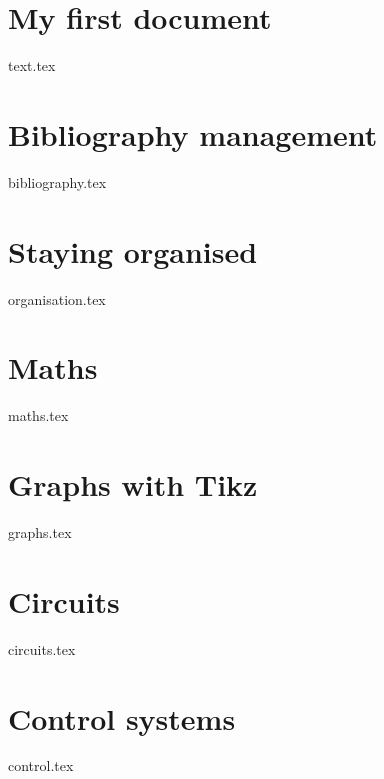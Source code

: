 \section{My first document}
    {text.tex}
\section{Bibliography management}
    {bibliography.tex}
\section{Staying organised}
    {organisation.tex}
\section{Maths}
    {maths.tex}
\section{Graphs with Tikz}
    {graphs.tex}
\section{Circuits}
    {circuits.tex}
\section{Control systems}
    {control.tex}